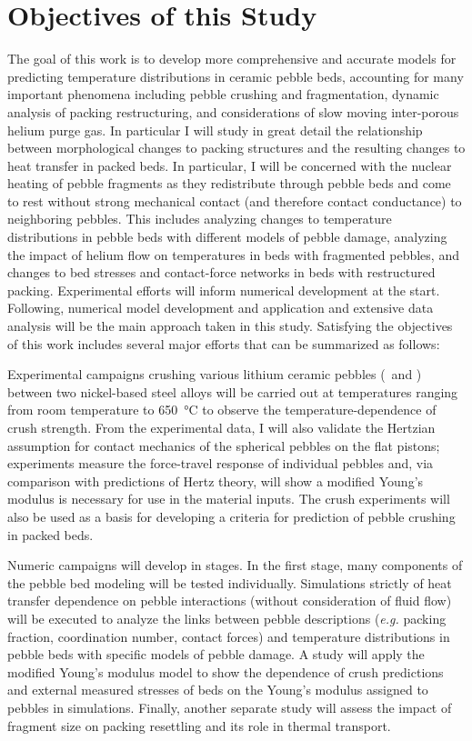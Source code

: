 \section{Objectives of this Study}\label{sec:intro-scope-of-work}
The goal of this work is to develop more comprehensive and accurate models for predicting temperature distributions in ceramic pebble beds, accounting for many important phenomena including pebble crushing and fragmentation, dynamic analysis of packing restructuring, and considerations of slow moving inter-porous helium purge gas. In particular I will study in great detail the relationship between morphological changes to packing structures and the resulting changes to heat transfer in packed beds. In particular, I will be concerned with the nuclear heating of pebble fragments as they redistribute through pebble beds and come to rest without strong mechanical contact (and therefore contact conductance) to neighboring pebbles. This includes analyzing changes to temperature distributions in pebble beds with different models of pebble damage, analyzing the impact of helium flow on temperatures in beds with fragmented pebbles, and changes to bed stresses and contact-force networks in beds with restructured packing. Experimental efforts will inform numerical development at the start. Following, numerical model development and application and extensive data analysis will be the main approach taken in this study. Satisfying the objectives of this work includes several major efforts that can be summarized as follows:

Experimental campaigns crushing various lithium ceramic pebbles (\lit~and \lis) between two nickel-based steel alloys will be carried out at temperatures ranging from room temperature to \SI{650}{\celsius} to observe the temperature-dependence of crush strength. From the experimental data, I will also validate the Hertzian assumption for contact mechanics of the spherical pebbles on the flat pistons; experiments measure the force-travel response of individual pebbles and, via comparison with predictions of Hertz theory, will show a modified Young's modulus is necessary for use in the material inputs. The crush experiments will also be used as a basis for developing a criteria for prediction of pebble crushing in packed beds. 

Numeric campaigns will develop in stages. In the first stage, many components of the pebble bed modeling will be tested individually. Simulations strictly of heat transfer dependence on pebble interactions (without consideration of fluid flow) will be executed to analyze the links between pebble descriptions (\textit{e.g.} packing fraction, coordination number, contact forces) and temperature distributions in pebble beds with specific models of pebble damage. A study will apply the modified Young's modulus model to show the dependence of crush predictions and external measured stresses of beds on the Young's modulus assigned to pebbles in simulations. Finally, another separate study will assess the impact of fragment size on packing resettling and its role in thermal transport.


